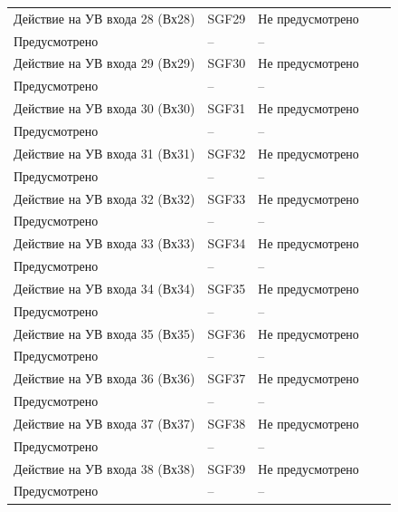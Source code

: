 \begin{longtable}{|>{\centering\arraybackslash}m{5.3cm}|>{\centering\arraybackslash}m{3.3cm}|>{\centering\arraybackslash}m{4.2cm}|>{\centering\arraybackslash}m{1.8cm}|>{\centering\arraybackslash}m{1cm}|}
\hline
\centering Действие на УВ входа 28 (Вх28)  & \centering SGF29 & \centering Не предусмотрено \\ Предусмотрено & \centering -- & \centering \arraybackslash -- \\
\hline
\centering Действие на УВ входа 29 (Вх29)  & \centering SGF30 & \centering Не предусмотрено \\ Предусмотрено & \centering -- & \centering \arraybackslash -- \\
\hline
\centering Действие на УВ входа 30 (Вх30)  & \centering SGF31 & \centering Не предусмотрено \\ Предусмотрено & \centering -- & \centering \arraybackslash -- \\
\hline
\centering Действие на УВ входа 31 (Вх31)  & \centering SGF32 & \centering Не предусмотрено \\ Предусмотрено & \centering -- & \centering \arraybackslash -- \\
\hline
\centering Действие на УВ входа 32 (Вх32)  & \centering SGF33 & \centering Не предусмотрено \\ Предусмотрено & \centering -- & \centering \arraybackslash -- \\
\hline
\centering Действие на УВ входа 33 (Вх33)  & \centering SGF34 & \centering Не предусмотрено \\ Предусмотрено & \centering -- & \centering \arraybackslash -- \\
\hline
\centering Действие на УВ входа 34 (Вх34)  & \centering SGF35 & \centering Не предусмотрено \\ Предусмотрено & \centering -- & \centering \arraybackslash -- \\
\hline
\centering Действие на УВ входа 35 (Вх35)  & \centering SGF36 & \centering Не предусмотрено \\ Предусмотрено & \centering -- & \centering \arraybackslash -- \\
\hline
\centering Действие на УВ входа 36 (Вх36)  & \centering SGF37 & \centering Не предусмотрено \\ Предусмотрено & \centering -- & \centering \arraybackslash -- \\
\hline
\centering Действие на УВ входа 37 (Вх37)  & \centering SGF38 & \centering Не предусмотрено \\ Предусмотрено & \centering -- & \centering \arraybackslash -- \\
\hline
\centering Действие на УВ входа 38 (Вх38)  & \centering SGF39 & \centering Не предусмотрено \\ Предусмотрено & \centering -- & \centering \arraybackslash -- \\

\end{longtable}
